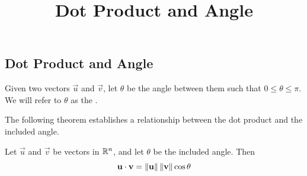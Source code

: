 \documentclass{ximera}
\title{Dot Product and Angle} \license{CC BY-NC-SA 4.0}
\begin{document}
\begin{abstract}

\end{abstract}
\maketitle

\begin{onlineOnly}
\section*{Dot Product and Angle}
\end{onlineOnly}

Given two vectors $\vec{u}$ and $\vec{v}$, let $\theta$ be the angle between them such that $0\leq\theta\leq \pi$.  We will refer to $\theta$ as the .

\begin{center}
\end{center}

The following theorem establishes a relationship between the dot product and the included angle.

  \begin{theorem}\label{th:dotproductcosine} Let $\vec{u}$ and $\vec{v}$ be vectors in $\mathbb{R}^n$, and let $\theta$ be the included angle.  Then
  \begin{equation*} \label{matlintrans}
 \mathbf{u}\cdot\mathbf{v}=\left\lVert\mathbf{u}\right\rVert\left\lVert\mathbf{v}\right\rVert\cos \theta
\end{equation*}
\end{theorem}
\end{document}
